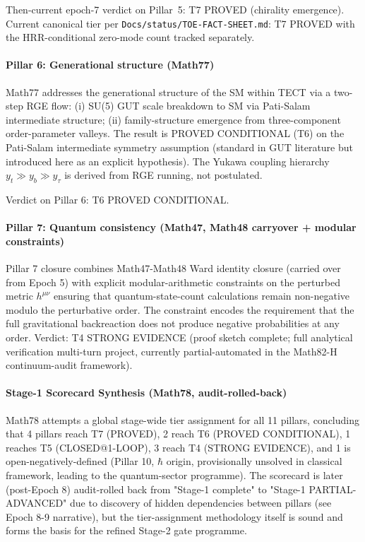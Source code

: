 Then-current epoch-7 verdict on Pillar~5: T7 PROVED (chirality
emergence). Current canonical tier per
\texttt{Docs/status/TOE-FACT-SHEET.md}: T7 PROVED with the
HRR-conditional zero-mode count tracked separately.

\paragraph{Pillar 6: Generational structure (Math77)}

Math77 addresses the generational structure of the SM within TECT via a
two-step RGE flow: (i) SU(5) GUT scale breakdown to SM via Pati-Salam
intermediate structure; (ii) family-structure emergence from three-component
order-parameter valleys. The result is PROVED CONDITIONAL (T6) on the
Pati-Salam intermediate symmetry assumption (standard in GUT literature but
introduced here as an explicit hypothesis). The Yukawa coupling hierarchy
$y_t \gg y_b \gg y_\tau$ is derived from RGE running, not postulated.

Verdict on Pillar 6: T6 PROVED CONDITIONAL.

\paragraph{Pillar 7: Quantum consistency (Math47, Math48 carryover + modular constraints)}

Pillar 7 closure combines Math47-Math48 Ward identity closure (carried over from
Epoch 5) with explicit modular-arithmetic constraints on the perturbed metric
$h^{\mu\nu}$ ensuring that quantum-state-count calculations remain non-negative
modulo the perturbative order. The constraint encodes the requirement that the
full gravitational backreaction does not produce negative probabilities at any
order. Verdict: T4 STRONG EVIDENCE (proof sketch complete; full analytical
verification multi-turn project, currently partial-automated in the
Math82-H continuum-audit framework).

\paragraph{Stage-1 Scorecard Synthesis (Math78, audit-rolled-back)}

Math78 attempts a global stage-wide tier assignment for all 11 pillars,
concluding that 4 pillars reach T7 (PROVED), 2 reach T6 (PROVED CONDITIONAL),
1 reaches T5 (CLOSED@1-LOOP), 3 reach T4 (STRONG EVIDENCE), and 1 is
open-negatively-defined (Pillar 10, $\hbar$ origin, provisionally unsolved in
classical framework, leading to the quantum-sector programme). The scorecard is
later (post-Epoch 8) audit-rolled back from "Stage-1 complete" to "Stage-1
PARTIAL-ADVANCED" due to discovery of hidden dependencies between pillars (see
Epoch 8-9 narrative), but the tier-assignment methodology itself is sound and
forms the basis for the refined Stage-2 gate programme.

